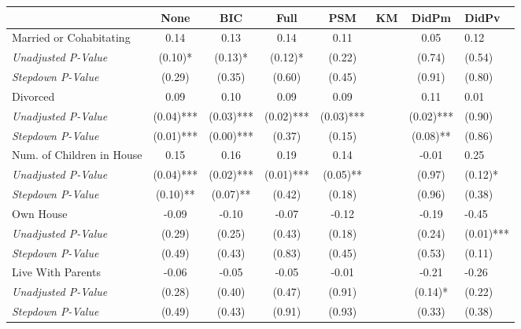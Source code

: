 \begin{tabular}{l c c c c c c}
\toprule
 & None & BIC & Full & PSM & KM & DidPm & DidPv \\
\midrule
Married or Cohabitating & 0.14 & 0.13 & 0.14 & 0.11 & & 0.05 & 0.12 \\
\quad \textit{Unadjusted P-Value} & (0.10)* & (0.13)* & (0.12)* & (0.22) & & (0.74) & (0.54) \\
\quad \textit{Stepdown P-Value} & (0.29) & (0.35) & (0.60) & (0.45) & & (0.91) & (0.80) \\
Divorced & 0.09 & 0.10 & 0.09 & 0.09 & & 0.11 & 0.01 \\
\quad \textit{Unadjusted P-Value} & (0.04)*** & (0.03)*** & (0.02)*** & (0.03)*** & & (0.02)*** & (0.90) \\
\quad \textit{Stepdown P-Value} & (0.01)*** & (0.00)*** & (0.37) & (0.15) & & (0.08)** & (0.86) \\
Num. of Children in House & 0.15 & 0.16 & 0.19 & 0.14 & & -0.01 & 0.25 \\
\quad \textit{Unadjusted P-Value} & (0.04)*** & (0.02)*** & (0.01)*** & (0.05)** & & (0.97) & (0.12)* \\
\quad \textit{Stepdown P-Value} & (0.10)** & (0.07)** & (0.42) & (0.18) & & (0.96) & (0.38) \\
Own House & -0.09 & -0.10 & -0.07 & -0.12 & & -0.19 & -0.45 \\
\quad \textit{Unadjusted P-Value} & (0.29) & (0.25) & (0.43) & (0.18) & & (0.24) & (0.01)*** \\
\quad \textit{Stepdown P-Value} & (0.49) & (0.43) & (0.83) & (0.45) & & (0.53) & (0.11) \\
Live With Parents & -0.06 & -0.05 & -0.05 & -0.01 & & -0.21 & -0.26 \\
\quad \textit{Unadjusted P-Value} & (0.28) & (0.40) & (0.47) & (0.91) & & (0.14)* & (0.22) \\
\quad \textit{Stepdown P-Value} & (0.49) & (0.43) & (0.91) & (0.93) & & (0.33) & (0.38) \\
\bottomrule
\end{tabular}
